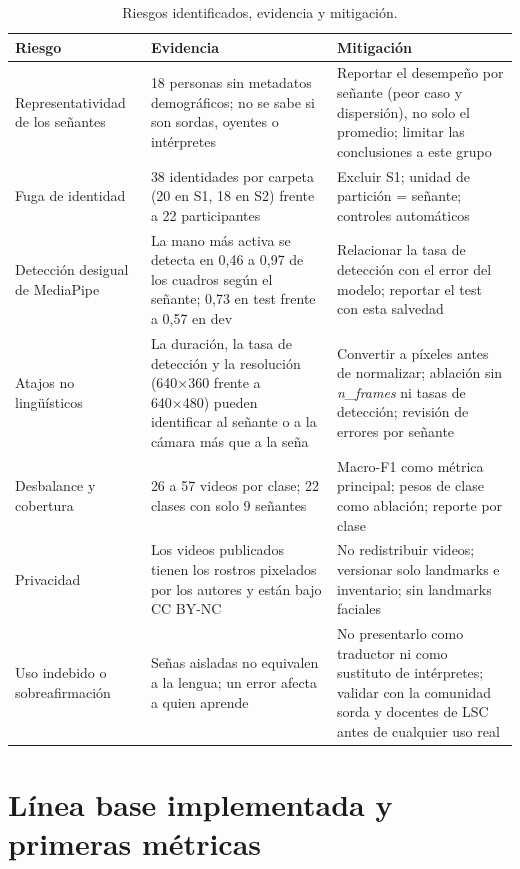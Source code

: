 \documentclass[11pt,a4paper]{article}
\newcommand{\code}[1]{\textit{#1}}
\begin{document}
\begin{table}[htbp]
\centering
\caption{Riesgos identificados, evidencia y mitigación.}
\small
\renewcommand{\arraystretch}{1.22}
\begin{tabularx}{\textwidth}{@{}>{\raggedright\arraybackslash}p{2.9cm}YY@{}}
\toprule
\textbf{Riesgo} & \textbf{Evidencia} & \textbf{Mitigación}\\
\midrule
Representatividad de los señantes & 18 personas sin metadatos demográficos; no se sabe si son sordas, oyentes o intérpretes & Reportar el desempeño por señante (peor caso y dispersión), no solo el promedio; limitar las conclusiones a este grupo\\\addlinespace[3pt]
Fuga de identidad & 38 identidades por carpeta (20 en S1, 18 en S2) frente a 22 participantes & Excluir S1; unidad de partición = señante; controles automáticos\\\addlinespace[3pt]
Detección desigual de MediaPipe & La mano más activa se detecta en 0,46 a 0,97 de los cuadros según el señante; 0,73 en test frente a 0,57 en dev & Relacionar la tasa de detección con el error del modelo; reportar el test con esta salvedad\\\addlinespace[3pt]
Atajos no lingüísticos & La duración, la tasa de detección y la resolución (640×360 frente a 640×480) pueden identificar al señante o a la cámara más que a la seña & Convertir a píxeles antes de normalizar; ablación sin \code{n\_frames} ni tasas de detección; revisión de errores por señante\\\addlinespace[3pt]
Desbalance y cobertura & 26 a 57 videos por clase; 22 clases con solo 9 señantes & Macro-F1 como métrica principal; pesos de clase como ablación; reporte por clase\\\addlinespace[3pt]
Privacidad & Los videos publicados tienen los rostros pixelados por los autores y están bajo CC BY-NC & No redistribuir videos; versionar solo landmarks e inventario; sin landmarks faciales\\\addlinespace[3pt]
Uso indebido o sobreafirmación & Señas aisladas no equivalen a la lengua; un error afecta a quien aprende & No presentarlo como traductor ni como sustituto de intérpretes; validar con la comunidad sorda y docentes de LSC antes de cualquier uso real\\
\bottomrule
\end{tabularx}
\end{table}

\section{Línea base implementada y primeras métricas}
\end{document}
